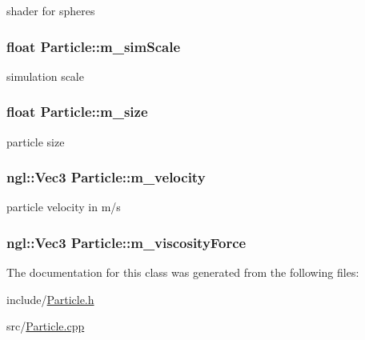 shader for spheres \hypertarget{classParticle_a5f9a1515ebe899af685c77d4f119ab45}{
\subsubsection[{m\_\-simScale}]{\setlength{\rightskip}{0pt plus 5cm}float {\bf Particle::m\_\-simScale}}}
\label{classParticle_a5f9a1515ebe899af685c77d4f119ab45}


simulation scale \hypertarget{classParticle_acf841a001a93c2c613b13402e3947c16}{
\subsubsection[{m\_\-size}]{\setlength{\rightskip}{0pt plus 5cm}float {\bf Particle::m\_\-size}}}
\label{classParticle_acf841a001a93c2c613b13402e3947c16}


particle size \hypertarget{classParticle_a3c6edff3c6a05d7eaac8eeb261bc0383}{
\subsubsection[{m\_\-velocity}]{\setlength{\rightskip}{0pt plus 5cm}ngl::Vec3 {\bf Particle::m\_\-velocity}}}
\label{classParticle_a3c6edff3c6a05d7eaac8eeb261bc0383}


particle velocity in m/s \hypertarget{classParticle_a40a8a467bfd99235cef6e1685a509869}{
\subsubsection[{m\_\-viscosityForce}]{\setlength{\rightskip}{0pt plus 5cm}ngl::Vec3 {\bf Particle::m\_\-viscosityForce}}}
\label{classParticle_a40a8a467bfd99235cef6e1685a509869}


The documentation for this class was generated from the following files:\begin{DoxyCompactItemize}
\item 
include/\hyperlink{Particle_8h}{Particle.h}\item 
src/\hyperlink{Particle_8cpp}{Particle.cpp}\end{DoxyCompactItemize}
